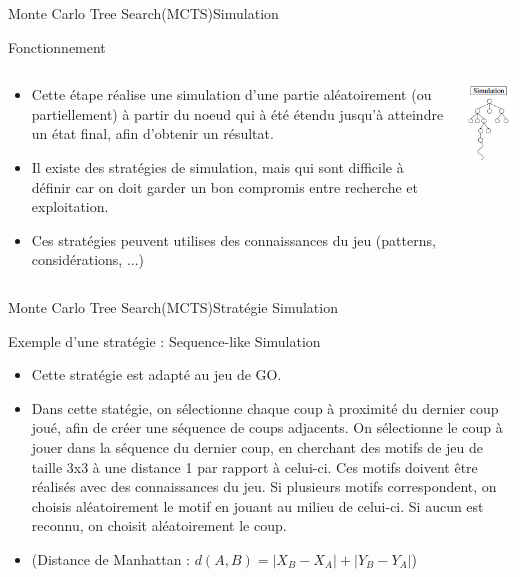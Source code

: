 \begin{frame}{Monte Carlo Tree Search(MCTS)}{Simulation}
	\begin{block}{Fonctionnement}
		\begin{columns}
			\begin{column}{7cm}
				\begin{itemize}
					\item Cette étape réalise une simulation d'une partie aléatoirement (ou partiellement) à partir du noeud qui à été étendu jusqu'à atteindre un état final, afin d'obtenir un résultat.
					\item Il existe des stratégies de simulation, mais qui sont difficile à définir car on doit garder un bon compromis entre recherche et exploitation.
					\item Ces stratégies peuvent utilises des connaissances du jeu (patterns, considérations, ...)
				\end{itemize}
			\end{column}
			\begin{column}{4cm}
				\includegraphics[width=3cm]{ressources/Simulation.png}
			\end{column}
		\end{columns}
	\end{block}
\end{frame}

\begin{frame}{Monte Carlo Tree Search(MCTS)}{Stratégie Simulation}
	\begin{block}{Exemple d'une stratégie : Sequence-like Simulation}
		\begin{itemize}
			\item Cette stratégie est adapté au jeu de GO.
			\item Dans cette statégie, on sélectionne chaque coup à proximité du dernier coup joué, afin de créer une séquence de coups adjacents. On sélectionne le coup à jouer dans la séquence du dernier coup, en cherchant des motifs de jeu de taille 3x3 à une distance 1 par rapport à celui-ci. Ces motifs doivent être réalisés avec des connaissances du jeu. Si plusieurs motifs correspondent, on choisis aléatoirement le motif en jouant au milieu de celui-ci. Si aucun est reconnu, on choisit aléatoirement le coup.
			\item (Distance de Manhattan : $d(A,B) = |X_{B} - X_{A}| + |Y_{B} - Y_{A}|$)
		\end{itemize}
	\end{block}
\end{frame}

